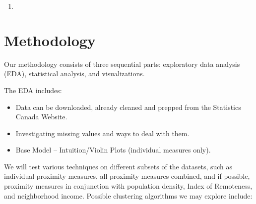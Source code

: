 \documentclass[11pt, a4paper]{article}
\newcommand{\comment}[1]{}
\begin{document}
\begin{enumerate}
\item 
\end{enumerate}






\section*{Methodology}

\comment{
\subsection*{Data Investigation}
\subsection*{Statistical Analysis}
\subsection*{Visualization}
}

Our methodology consists of three sequential parts: exploratory data analysis (EDA), statistical analysis, and visualizations.
\par
The EDA includes:
\begin{itemize}
\item Data can be downloaded, already cleaned and prepped from the Statistics Canada Website.
\item Investigating missing values and ways to deal with them.
\item Base Model – Intuition/Violin Plots (individual measures only).
\end{itemize}

We will test various techniques on different subsets of the datasets, such as individual proximity measures, all proximity measures combined, and if possible, proximity measures in conjunction with population density, Index of Remoteness, and neighborhood income. Possible clustering algorithms we may explore include:
\end{document}

